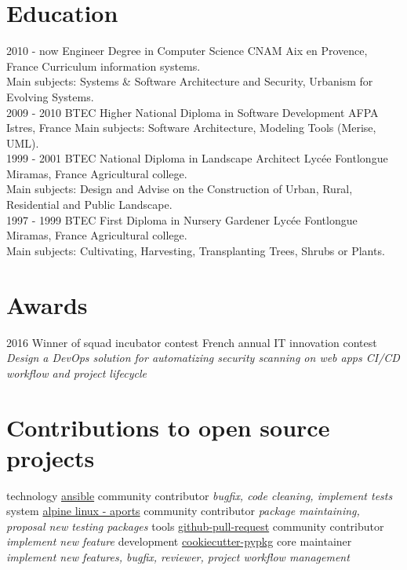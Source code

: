 \documentclass[]{friggeri-cv}
\begin{document}
\section{Education}
\begin{entrylist}
    \entry
        {2010 - now}
        {Engineer Degree in Computer Science}
        {CNAM Aix en Provence, France}
        {Curriculum information systems.\\
        Main subjects: Systems \& Software Architecture and Security,
        Urbanism for Evolving Systems.\\}
    \entry
        {2009 - 2010}
        {BTEC Higher National Diploma in Software Development}
        {AFPA Istres, France}
        {Main subjects: Software Architecture, Modeling Tools (Merise, UML).\\}
    \entry
        {1999 - 2001}
        {BTEC National Diploma in Landscape Architect}
        {Lycée Fontlongue Miramas, France}
        {Agricultural college.\\
        Main subjects: Design and Advise on the Construction of Urban, Rural, 
        Residential and Public Landscape.\\}
    \entry
        {1997 - 1999}
        {BTEC First Diploma in Nursery Gardener}
        {Lycée Fontlongue Miramas, France}
        {Agricultural college.\\
        Main subjects: Cultivating, Harvesting, Transplanting Trees, Shrubs or Plants.}
\end{entrylist}

\section{Awards}
\begin{entrylist}
    \entry
        {2016}
        {Winner of squad incubator contest}
        {French annual IT innovation contest}
        {\emph{Design a DevOps solution for automatizing security scanning on
        web apps CI/CD workflow and project lifecycle}}
\end{entrylist}

\section{Contributions to open source projects}
\begin{entrylist}
    \entry
        {technology}
        {\href{https://github.com/ansible/ansible}{ansible}}
        {community contributor}
        {\emph{bugfix, code cleaning, implement tests}}
    \entry
        {system}
        {\href{https://github.com/alpinelinux/aports}{alpine linux - aports}}
        {community contributor}
        {\emph{package maintaining, proposal new testing packages}}
    \entry
        {tools}
        {\href{https://github.com/jd/git-pull-request}{github-pull-request}}
        {community contributor}
        {\emph{implement new feature}}
    \entry
        {development}
        {\href{https://github.com/AntoineCezar/cookiecutter-pypkg}{cookiecutter-pypkg}}
        {core maintainer}
        {\emph{implement new features, bugfix, reviewer, project workflow management}}
\end{entrylist}
\end{document}
